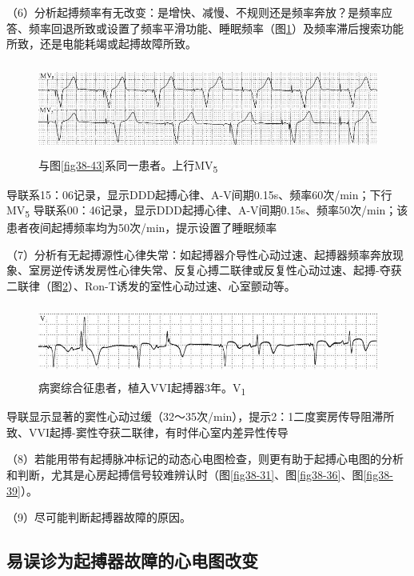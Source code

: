 （6）分析起搏频率有无改变：是增快、减慢、不规则还是频率奔放？是频率应答、频率回退所致或设置了频率平滑功能、睡眠频率（图\ref{fig38-45}）及频率滞后搜索功能所致，还是电能耗竭或起搏故障所致。

\begin{figure}[!htbp]
 \centering
 \includegraphics[width=5.58333in,height=1.1875in]{./images/Image00648.jpg}
 \captionsetup{justification=centering}
 \caption{与图\ref{fig38-43}系同一患者。上行MV\textsubscript{5}}
 \label{fig38-45}
  \end{figure} 
导联系15：06记录，显示DDD起搏心律、A-V间期0.15s、频率60次/min；下行MV\textsubscript{5}
导联系00：46记录，显示DDD起搏心律、A-V间期0.15s、频率50次/min；该患者夜间起搏频率均为50次/min，提示设置了睡眠频率

（7）分析有无起搏源性心律失常：如起搏器介导性心动过速、起搏器频率奔放现象、室房逆传诱发房性心律失常、反复心搏二联律或反复性心动过速、起搏-夺获二联律（图\ref{fig38-46}）、Ron-T诱发的室性心动过速、心室颤动等。

\begin{figure}[!htbp]
 \centering
 \includegraphics[width=5.57292in,height=0.92708in]{./images/Image00649.jpg}
 \captionsetup{justification=centering}
 \caption{病窦综合征患者，植入VVI起搏器3年。V\textsubscript{1}}
 \label{fig38-46}
  \end{figure} 
导联显示显著的窦性心动过缓（32～35次/min），提示2：1二度窦房传导阻滞所致、VVI起搏-窦性夺获二联律，有时伴心室内差异性传导

（8）若能用带有起搏脉冲标记的动态心电图检查，则更有助于起搏心电图的分析和判断，尤其是心房起搏信号较难辨认时（图\ref{fig38-31}、图\ref{fig38-36}、图\ref{fig38-39}）。

（9）尽可能判断起搏器故障的原因。

\protect\hypertarget{text00045.htmlux5cux23subid507}{}{}

\subsection{易误诊为起搏器故障的心电图改变}

